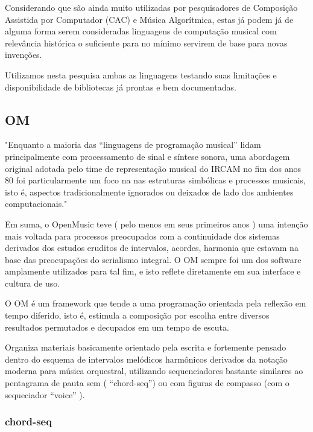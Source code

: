 \documentclass[
	12pt,				%
	openright,			%
	twoside,			%
	a4paper,			%
	english,			%
	french,				%
	spanish,			%
	brazil				%
	]{abntex2}
\begin{document}
Considerando que são ainda muito utilizadas por pesquisadores de Composição Assistida por Computador (CAC) e Música Algorítmica, estas já podem já de alguma forma serem consideradas linguagens de computação musical com relevância histórica o suficiente para no mínimo servirem de base para novas invenções.

Utilizamos nesta pesquisa ambas as linguagens testando suas limitações e disponibilidade de bibliotecas já prontas e bem documentadas. 



\subsection{OM}

\begin{citacao}
"Enquanto a maioria das “linguagens de programação musical” lidam principalmente com processamento de sinal e síntese
sonora, uma abordagem original adotada pelo time de representação musical do IRCAM no fim dos anos 80 foi
particularmente um foco na nas estruturas simbólicas e processos musicais, isto é, aspectos tradicionalmente
ignorados ou deixados de lado dos ambientes computacionais."\cite{bresson2011openmusic}
\end{citacao}

Em suma, o OpenMusic teve ( pelo menos em seus primeiros anos ) uma intenção mais voltada para processos preocupados com a continuidade dos sistemas derivados dos estudos eruditos de intervalos, acordes, harmonia que estavam na base das preocupações do serialismo integral. O OM sempre foi um dos software amplamente utilizados para tal fim, e isto reflete diretamente em sua interface e cultura de uso.


O OM é um framework que tende a uma programação orientada pela reflexão em tempo diferido, isto é, estimula a composição por escolha entre diversos resultados permutados e decupados em um tempo de escuta.

Organiza materiais basicamente orientado pela escrita e fortemente pensado dentro do esquema de intervalos melódicos
harmônicos derivados da notação moderna para música orquestral, utilizando sequenciadores bastante similares ao pentagrama de pauta sem ( “chord-seq”) ou com figuras de compasso (com o sequeciador “voice” ).

\subsubsection{chord-seq}
\end{document}
